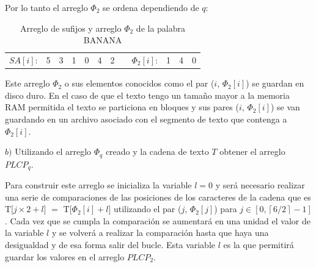 \newpage

Por lo tanto el arreglo $\Phi_{2}$ se ordena dependiendo de $q$:

\begin{table}[!htb]
\centering
\begin{tabular}{c|c|c|c|c|c|c|cc|c|c|c|}
\cline{2-7} \cline{10-12}
$SA[i]$: & 5 & 3 & 1 & 0 & 4 & 2 &  & $\Phi_{2}[i]$: & 1 & 4 & 0 \\ \cline{2-7} \cline{10-12} 
\end{tabular}
\caption{Arreglo de sufijos y arreglo $\Phi_{2}$ de la palabra BANANA}
\end{table}


Este arreglo $\Phi_{2}$ o sus elementos conocidos como el par ($i$, $\Phi_{2}[i]$) se guardan en disco duro. En el caso de que el texto tengo un tamaño mayor a la memoria RAM permitida el texto se particiona en bloques y sus pares ($i$, $\Phi_{2}[i]$) se van guardando en un archivo asociado con el segmento de texto que contenga a $\Phi_{2}[i]$.

$b)$ Utilizando el arreglo $\Phi_{q}$ creado y la cadena de texto $T$ obtener el arreglo $PLCP_{q}$.

Para construir este arreglo se inicializa la variable $l=0$ y será necesario realizar una serie de comparaciones de las posiciones de los caracteres de la cadena que es T[$j \times 2+l$] $=$ T[$\Phi_{2}[i]+l$] utilizando el par ($j$, $\Phi_{2}[j]$) para $j \in [0, \left \lceil{6/2}\right \rceil - 1]$. Cada vez que se cumpla la comparación se aumentará en una unidad el valor de la variable $l$ y se volverá a realizar la comparación hasta que haya una desigualdad y de esa forma salir del bucle. Esta variable $l$ es la que permitirá guardar los valores en el arreglo $PLCP_{2}$.


